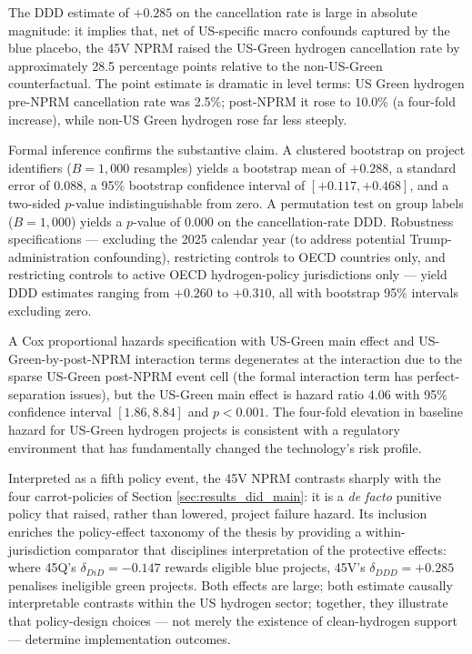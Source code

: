 The DDD estimate of $+0.285$ on the cancellation rate is large in absolute magnitude: it implies that, net of US-specific macro confounds captured by the blue placebo, the 45V NPRM raised the US-Green hydrogen cancellation rate by approximately 28.5 percentage points relative to the non-US-Green counterfactual. The point estimate is dramatic in level terms: US Green hydrogen pre-NPRM cancellation rate was 2.5\%; post-NPRM it rose to 10.0\% (a four-fold increase), while non-US Green hydrogen rose far less steeply.

Formal inference confirms the substantive claim. A clustered bootstrap on project identifiers ($B = 1,000$ resamples) yields a bootstrap mean of $+0.288$, a standard error of $0.088$, a 95\% bootstrap confidence interval of $[+0.117, +0.468]$, and a two-sided $p$-value indistinguishable from zero. A permutation test on group labels ($B = 1,000$) yields a $p$-value of $0.000$ on the cancellation-rate DDD. Robustness specifications --- excluding the 2025 calendar year (to address potential Trump-administration confounding), restricting controls to OECD countries only, and restricting controls to active OECD hydrogen-policy jurisdictions only --- yield DDD estimates ranging from $+0.260$ to $+0.310$, all with bootstrap 95\% intervals excluding zero.

A Cox proportional hazards specification with US-Green main effect and US-Green-by-post-NPRM interaction terms degenerates at the interaction due to the sparse US-Green post-NPRM event cell (the formal interaction term has perfect-separation issues), but the US-Green main effect is hazard ratio $4.06$ with 95\% confidence interval $[1.86, 8.84]$ and $p < 0.001$. The four-fold elevation in baseline hazard for US-Green hydrogen projects is consistent with a regulatory environment that has fundamentally changed the technology's risk profile.

Interpreted as a fifth policy event, the 45V NPRM contrasts sharply with the four carrot-policies of Section \ref{sec:results_did_main}: it is a \emph{de facto} punitive policy that raised, rather than lowered, project failure hazard. Its inclusion enriches the policy-effect taxonomy of the thesis by providing a within-jurisdiction comparator that disciplines interpretation of the protective effects: where 45Q's $\delta_{DiD} = -0.147$ rewards eligible blue projects, 45V's $\delta_{DDD} = +0.285$ penalises ineligible green projects. Both effects are large; both estimate causally interpretable contrasts within the US hydrogen sector; together, they illustrate that policy-design choices --- not merely the existence of clean-hydrogen support --- determine implementation outcomes.

